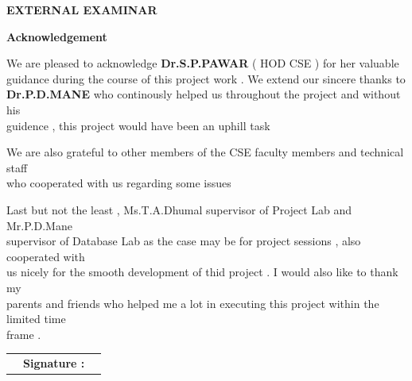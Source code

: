 \documentclass[12pt]{article}
\begin{document}
 \begin{center}
 \large \textbf { EXTERNAL EXAMINAR }
 \end{center} 


\clearpage




\begin{center}
 \Large \textbf {Acknowledgement}\\[30mm]
 \end{center}\par
 We are pleased to acknowledge \textbf{Dr.S.P.PAWAR} ( HOD CSE ) for her valuable \\[1mm]
 guidance during the course of this project work . We extend our sincere thanks to \\[1mm]
 \textbf{Dr.P.D.MANE} who continously helped us throughout the project and without his\\[1mm]
  guidence , this project would have been an uphill task\\[5mm]\par
We are also grateful to other members of the CSE faculty members and technical staff\\[1mm]
 who cooperated with us regarding some issues\\[5mm]\par 
Last but not the least , Ms.T.A.Dhumal supervisor of Project Lab and Mr.P.D.Mane\\[1mm]
 supervisor of Database Lab as the case may be for project sessions , also cooperated with\\[1mm]
  us nicely for the smooth development of thid project . I would also like to thank my\\[1mm]
   parents and friends who helped me a lot in executing this project within the limited time\\[1mm]
    frame . \\[40mm]
   
\begin{tabular}{ c c c } 
  \hspace{3.4in} & \large \textbf{Signature : } \\ [5mm] 
 \end{tabular}      
    
\end{document}

